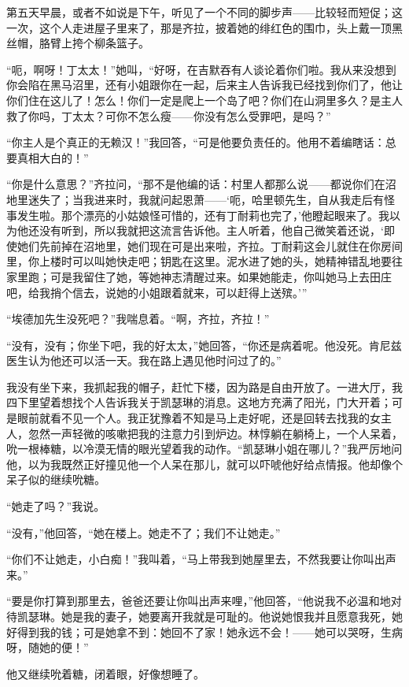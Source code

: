 \par 第五天早晨，或者不如说是下午，听见了一个不同的脚步声——比较轻而短促；这一次，这个人走进屋子里来了，那是齐拉，披着她的绯红色的围巾，头上戴一顶黑丝帽，胳臂上挎个柳条篮子。
\par “呃，啊呀！丁太太！”她叫，“好呀，在吉默吞有人谈论着你们啦。我从来没想到你会陷在黑马沼里，还有小姐跟你在一起，后来主人告诉我已经找到你们了，他让你们住在这儿了！怎么！你们一定是爬上一个岛了吧？你们在山洞里多久？是主人救了你吗，丁太太？可你不怎么瘦——你没有怎么受罪吧，是吗？”
\par “你主人是个真正的无赖汉！”我回答，“可是他要负责任的。他用不着编瞎话：总要真相大白的！”
\par “你是什么意思？”齐拉问，“那不是他编的话：村里人都那么说——都说你们在沼地里迷失了；当我进来时，我就问起恩萧——‘呃，哈里顿先生，自从我走后有怪事发生啦。那个漂亮的小姑娘怪可惜的，还有丁耐莉也完了，’他瞪起眼来了。我以为他还没有听到，所以我就把这流言告诉他。主人听着，他自己微笑着还说，‘即使她们先前掉在沼地里，她们现在可是出来啦，齐拉。丁耐莉这会儿就住在你房间里，你上楼时可以叫她快走吧；钥匙在这里。泥水进了她的头，她精神错乱地要往家里跑；可是我留住了她，等她神志清醒过来。如果她能走，你叫她马上去田庄吧，给我捎个信去，说她的小姐跟着就来，可以赶得上送殡。'”
\par “埃德加先生没死吧？”我喘息着。“啊，齐拉，齐拉！”
\par “没有，没有；你坐下吧，我的好太太，”她回答，“你还是病着呢。他没死。肯尼兹医生认为他还可以活一天。我在路上遇见他时问过了的。”
\par 我没有坐下来，我抓起我的帽子，赶忙下楼，因为路是自由开放了。一进大厅，我四下里望着想找个人告诉我关于凯瑟琳的消息。这地方充满了阳光，门大开着；可是眼前就看不见一个人。我正犹豫着不知是马上走好呢，还是回转去找我的女主人，忽然一声轻微的咳嗽把我的注意力引到炉边。林惇躺在躺椅上，一个人呆着，吮一根棒糖，以冷漠无情的眼光望着我的动作。“凯瑟琳小姐在哪儿？”我严厉地问他，以为我既然正好撞见他一个人呆在那儿，就可以吓唬他好给点情报。他却像个呆子似的继续吮糖。
\par “她走了吗？”我说。
\par “没有，”他回答，“她在楼上。她走不了；我们不让她走。”
\par “你们不让她走，小白痴！”我叫着，“马上带我到她屋里去，不然我要让你叫出声来。”
\par “要是你打算到那里去，爸爸还要让你叫出声来哩，”他回答，“他说我不必温和地对待凯瑟琳。她是我的妻子，她要离开我就是可耻的。他说她恨我并且愿意我死，她好得到我的钱；可是她拿不到：她回不了家！她永远不会！——她可以哭呀，生病呀，随她的便！”
\par 他又继续吮着糖，闭着眼，好像想睡了。
